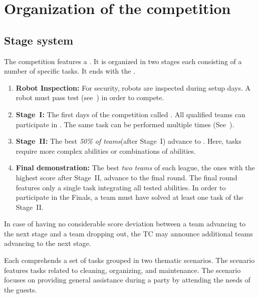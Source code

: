 \section{Organization of the competition}
\label{sec:procedure_during_competition}

\subsection{Stage system}\label{rule:stages}

The competition features a . It is organized in two stages each consisting of a number of specific tasks. It ends with the .


\begin{enumerate}
	\item \textbf{Robot Inspection:} For security, robots are inspected during setup days.
	A robot must pass  test (see~) in order to compete.

	\item \textbf{Stage~I:} The first days of the competition called .
	All qualified teams can participate in .
	The same task can be performed multiple times (See~).

	\item \textbf{Stage~II:} The best \emph{50\% of teams}\footnotemark (after Stage~I) advance to .
	Here, tasks require more complex abilities or combinations of abilities.\\

	\item \textbf{Final demonstration:} The best \emph{two teams} of each league, the ones with the highest score after Stage~II, advance to the final round.
	The final round features only a single task integrating all tested abilities.
	In order to participate in the Finals, a team must have solved at least one task of the Stage~II.
\end{enumerate}

In case of having no considerable score deviation between a team advancing to the next stage and a team dropping out, the TC may announce additional teams advancing to the next stage.

Each  comprehends a set of tasks grouped in two thematic scenarios.
The  scenario features tasks related to cleaning, organizing, and maintenance.
The  scenario focuses on providing general assistance during a party by attending the needs of the guests.


